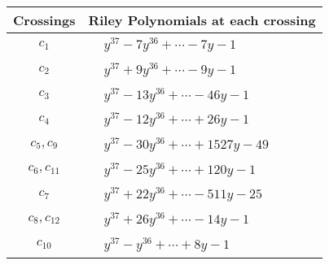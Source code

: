 \documentclass[1p]{elsarticle_modified}
\theoremstyle{definition}
\begin{document}
\begin{tabular}{m{50pt}|m{274pt}}
Crossings & \hspace{64pt}Riley Polynomials at each crossing \\
\hline $$\begin{aligned}c_{1}\end{aligned}$$&$\begin{aligned}
&y^{37}-7 y^{36}+\cdots-7 y-1
\end{aligned}$\\
\hline $$\begin{aligned}c_{2}\end{aligned}$$&$\begin{aligned}
&y^{37}+9 y^{36}+\cdots-9 y-1
\end{aligned}$\\
\hline $$\begin{aligned}c_{3}\end{aligned}$$&$\begin{aligned}
&y^{37}-13 y^{36}+\cdots-46 y-1
\end{aligned}$\\
\hline $$\begin{aligned}c_{4}\end{aligned}$$&$\begin{aligned}
&y^{37}-12 y^{36}+\cdots+26 y-1
\end{aligned}$\\
\hline $$\begin{aligned}c_{5},c_{9}\end{aligned}$$&$\begin{aligned}
&y^{37}-30 y^{36}+\cdots+1527 y-49
\end{aligned}$\\
\hline $$\begin{aligned}c_{6},c_{11}\end{aligned}$$&$\begin{aligned}
&y^{37}-25 y^{36}+\cdots+120 y-1
\end{aligned}$\\
\hline $$\begin{aligned}c_{7}\end{aligned}$$&$\begin{aligned}
&y^{37}+22 y^{36}+\cdots-511 y-25
\end{aligned}$\\
\hline $$\begin{aligned}c_{8},c_{12}\end{aligned}$$&$\begin{aligned}
&y^{37}+26 y^{36}+\cdots-14 y-1
\end{aligned}$\\
\hline $$\begin{aligned}c_{10}\end{aligned}$$&$\begin{aligned}
&y^{37}- y^{36}+\cdots+8 y-1
\end{aligned}$\\
\hline
\end{tabular}\\~\\
\end{document}

